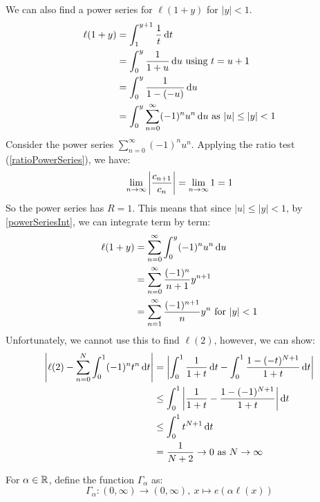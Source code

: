 \documentclass[../main.tex]{subfiles}
\begin{document}
\begin{remark}
  We can also find a power series for $\ell(1 + y)$ for $|y| < 1$.
  \begin{align*}
    \ell(1 + y) &= \int_{1}^{y + 1} \frac{1}{t} \d{t} \\
                &= \int_{0}^{y} \frac{1}{1 + u} \d{u} \text{ using $t = u + 1$} \\
                &= \int_{0}^{y} \frac{1}{1 - (-u)} \d{u} \\
                &= \int_{0}^{y} \sum_{n = 0}^{\infty} (-1)^{n}u^{n} \d{u} \text{ as $|u| \leq |y| < 1$}
  \end{align*}
  Consider the power series $\sum_{n = 0}^{\infty} (-1)^{n}u^{n}$.
  Applying the ratio test (\cref{ratioPowerSeries}), we have:
  \[
    \lim_{n \to \infty} \left\lvert \frac{c_{n + 1}}{c_{n}} \right\rvert = \lim_{n \to \infty} 1 = 1
  \]
  So the power series has $R = 1$.
  This means that since $|u| \leq |y| < 1$, by \cref{powerSeriesInt}, we can integrate term by term:
  \begin{align*}
    \ell(1 + y) &= \sum_{n = 0}^{\infty} \int_{0}^{y} (-1)^{n} u^{n} \d{u} \\
                &= \sum_{n = 0}^{\infty} \frac{(-1)^{n}}{n + 1}y^{n + 1} \\
                &= \sum_{n = 1}^{\infty} \frac{(-1)^{n + 1}}{n}y^{n} \text{ for $|y| < 1$}
  \end{align*}
  Unfortunately, we cannot use this to find $\ell(2)$, however, we can show:
  \begin{align*}
    \abs{\ell(2) - \sum_{n = 0}^{N} \int_{0}^{1} (-1)^{n}t^{n} \d{t}} &= \abs{\int_{0}^{1} \frac{1}{1 + t} \d{t} - \int_{0}^{1} \frac{1-(-t)^{N + 1}}{1 + t} \d{t}} \\
                                                                      &\leq \int_{0}^{1} \abs{\frac{1}{1 + t} - \frac{1 - (-1)^{N + 1}}{1 + t}} \d{t} \\
                                                                      &\leq \int_{0}^{1} t^{N + 1} \d{t} \\
                                                                      &= \frac{1}{N + 2} \to 0 \text{ as } N \to \infty
  \end{align*}
\end{remark}
\begin{definition}
  For $\alpha \in \mathbb{R}$, define the function $\Gamma_{\alpha}$ as:
  \[
    \Gamma_{\alpha}: (0, \infty) \to (0, \infty),\ x \mapsto e(\alpha \ell(x))
  \]
\end{definition}
\end{document}
